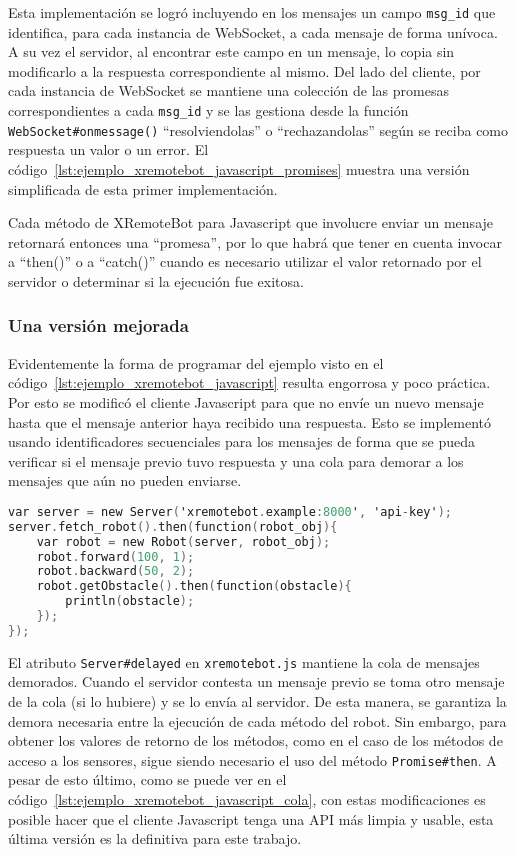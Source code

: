 Esta implementación se logró incluyendo en los mensajes un campo
\texttt{msg\_id} que identifica, para cada instancia de WebSocket, a
cada mensaje de forma unívoca. A su vez el servidor, al encontrar este
campo en un mensaje, lo copia sin modificarlo a la respuesta correspondiente
al mismo. Del lado del cliente, por cada instancia de WebSocket se mantiene
una colección de las promesas correspondientes
a cada \texttt{msg\_id} y se las gestiona desde la función
\texttt{WebSocket\#onmessage()} ``resolviendolas'' o ``rechazandolas'' según
se reciba como respuesta un valor o un error. El
código~\ref{lst:ejemplo_xremotebot_javascript_promises} muestra una versión
simplificada de esta primer implementación.

Cada método de XRemoteBot para Javascript que involucre enviar un mensaje
retornará entonces una ``promesa'', por lo que habrá que tener en cuenta
invocar a ``then()'' o a ``catch()'' cuando es necesario
utilizar el valor retornado por el servidor o determinar si la ejecución fue exitosa.

\subsubsection{Una versión mejorada}

Evidentemente la forma de programar del ejemplo visto en el
código~\ref{lst:ejemplo_xremotebot_javascript}
resulta engorrosa y poco práctica.
Por esto se modificó el cliente Javascript para que no envíe un nuevo mensaje hasta
que el mensaje anterior haya recibido una respuesta. Esto se implementó usando
identificadores secuenciales para los mensajes de forma que se pueda verificar si
el mensaje previo tuvo respuesta y una cola para demorar a los mensajes que aún no
pueden enviarse.

\begin{lstlisting}[language=C,
caption={Ejemplo de XRemoteBot en Javascript con empleo de una cola para
serializar mensajes},
label=lst:ejemplo_xremotebot_javascript_cola]
var server = new Server('xremotebot.example:8000', 'api-key');
server.fetch_robot().then(function(robot_obj){
    var robot = new Robot(server, robot_obj);
    robot.forward(100, 1);
    robot.backward(50, 2);
    robot.getObstacle().then(function(obstacle){
        println(obstacle);
    });
});
\end{lstlisting}

El atributo \texttt{Server\#delayed} en \texttt{xremotebot.js} mantiene la cola
de mensajes demorados.
Cuando el servidor contesta un mensaje previo se toma otro mensaje
de la cola (si lo hubiere) y se lo envía al servidor. De esta manera,
se garantiza la demora necesaria entre la ejecución de cada método
del robot. Sin embargo, para obtener los valores de retorno de los métodos,
como en el caso de los métodos de acceso a los sensores, sigue siendo
necesario el uso del método \texttt{Promise\#then}. A pesar de esto último,
como se puede ver en el código~\ref{lst:ejemplo_xremotebot_javascript_cola},
con estas modificaciones es posible hacer que el cliente Javascript
tenga una API más limpia y usable, esta última versión es la definitiva
para este trabajo.

